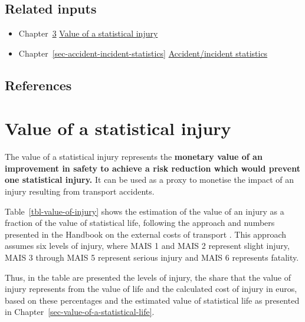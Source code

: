 \documentclass[
  11pt,
  a4paper,
]{book}
\begin{document}
\hypertarget{related-inputs-15}{%
\section{Related inputs}\label{related-inputs-15}}

\begin{itemize}
\item
  Chapter~\ref{sec-value-of-statistical-injury}
  \protect\hyperlink{sec-value-of-statistical-injury}{Value of a
  statistical injury}
\item
  Chapter~\ref{sec-accident-incident-statistics}
  \protect\hyperlink{sec-accident-incident-statistics}{Accident/incident
  statistics}
\end{itemize}

\hypertarget{references-17}{%
\section{References}\label{references-17}}

\hypertarget{sec-value-of-statistical-injury}{%
\chapter{Value of a statistical
injury}\label{sec-value-of-statistical-injury}}

The value of a statistical injury represents the \textbf{monetary value
of an improvement in safety to achieve a risk reduction which would
prevent one statistical injury.} It can be used as a proxy to monetise
the impact of an injury resulting from transport accidents.

Table~\ref{tbl-value-of-injury} shows the estimation of the value of an
injury as a fraction of the value of statistical life, following the
approach and numbers presented in the Handbook on the external costs of
transport . This approach assumes six levels of injury, where MAIS 1 and
MAIS 2 represent slight injury, MAIS 3 through MAIS 5 represent serious
injury and MAIS 6 represents fatality.

Thus, in the table are presented the levels of injury, the share that
the value of injury represents from the value of life and the calculated
cost of injury in euros, based on these percentages and the estimated
value of statistical life as presented in
Chapter~\ref{sec-value-of-a-statistical-life}.
\end{document}
